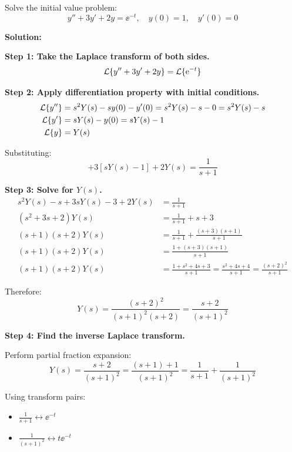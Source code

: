 \begin{examplebox}[title=Example: Solving a Second-Order ODE]
Solve the initial value problem:
\begin{equation}
y'' + 3y' + 2y = \ee^{-t}, \quad y(0) = 1, \quad y'(0) = 0
\end{equation}

\textbf{Solution:}

\textbf{Step 1: Take the Laplace transform of both sides.}
\begin{equation}
\mathcal{L}\{y'' + 3y' + 2y\} = \mathcal{L}\{\mathrm{e}^{-t}\}
\end{equation}

\textbf{Step 2: Apply differentiation property with initial conditions.}
\begin{align}
\mathcal{L}\{y''\} &= s^2Y(s) - sy(0) - y'(0) = s^2Y(s) - s - 0 = s^2Y(s) - s \\
\mathcal{L}\{y'\} &= sY(s) - y(0) = sY(s) - 1 \\
\mathcal{L}\{y\} &= Y(s)
\end{align}

Substituting:
\begin{equation}
[s^2Y(s) - s] + 3[sY(s) - 1] + 2Y(s) = \frac{1}{s+1}
\end{equation}

\textbf{Step 3: Solve for $Y(s)$.}
\begin{align}
s^2Y(s) - s + 3sY(s) - 3 + 2Y(s) &= \frac{1}{s+1} \\
(s^2 + 3s + 2)Y(s) &= \frac{1}{s+1} + s + 3 \\
(s+1)(s+2)Y(s) &= \frac{1}{s+1} + \frac{(s+3)(s+1)}{s+1} \\
(s+1)(s+2)Y(s) &= \frac{1 + (s+3)(s+1)}{s+1} \\
(s+1)(s+2)Y(s) &= \frac{1 + s^2 + 4s + 3}{s+1} = \frac{s^2 + 4s + 4}{s+1} = \frac{(s+2)^2}{s+1}
\end{align}

Therefore:
\begin{equation}
Y(s) = \frac{(s+2)^2}{(s+1)^2(s+2)} = \frac{s+2}{(s+1)^2}
\end{equation}

\textbf{Step 4: Find the inverse Laplace transform.}

Perform partial fraction expansion:
\begin{equation}
Y(s) = \frac{s+2}{(s+1)^2} = \frac{(s+1) + 1}{(s+1)^2} = \frac{1}{s+1} + \frac{1}{(s+1)^2}
\end{equation}

Using transform pairs:
\begin{itemize}
    \item $\frac{1}{s+1} \leftrightarrow \ee^{-t}$
    \item $\frac{1}{(s+1)^2} \leftrightarrow t\ee^{-t}$
\end{itemize}


\end{examplebox}

